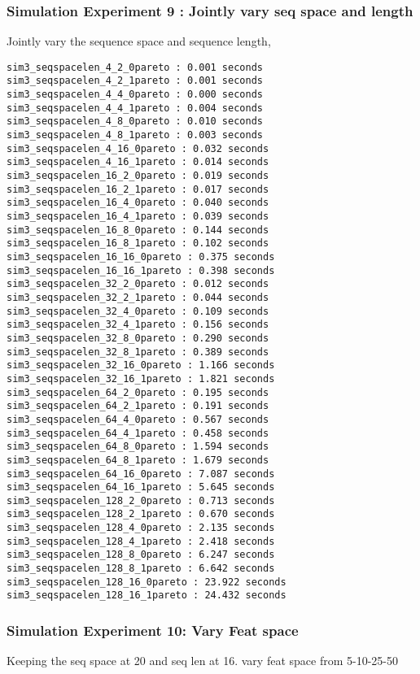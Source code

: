 \documentclass{article}
\begin{document}
\subsubsection{Simulation Experiment 9 : Jointly vary seq space and length}
\label{sim:seqspacelen}
Jointly vary the sequence space and sequence length, 
\begin{verbatim}
sim3_seqspacelen_4_2_0pareto : 0.001 seconds
sim3_seqspacelen_4_2_1pareto : 0.001 seconds
sim3_seqspacelen_4_4_0pareto : 0.000 seconds
sim3_seqspacelen_4_4_1pareto : 0.004 seconds
sim3_seqspacelen_4_8_0pareto : 0.010 seconds
sim3_seqspacelen_4_8_1pareto : 0.003 seconds
sim3_seqspacelen_4_16_0pareto : 0.032 seconds
sim3_seqspacelen_4_16_1pareto : 0.014 seconds
sim3_seqspacelen_16_2_0pareto : 0.019 seconds
sim3_seqspacelen_16_2_1pareto : 0.017 seconds
sim3_seqspacelen_16_4_0pareto : 0.040 seconds
sim3_seqspacelen_16_4_1pareto : 0.039 seconds
sim3_seqspacelen_16_8_0pareto : 0.144 seconds
sim3_seqspacelen_16_8_1pareto : 0.102 seconds
sim3_seqspacelen_16_16_0pareto : 0.375 seconds
sim3_seqspacelen_16_16_1pareto : 0.398 seconds
sim3_seqspacelen_32_2_0pareto : 0.012 seconds
sim3_seqspacelen_32_2_1pareto : 0.044 seconds
sim3_seqspacelen_32_4_0pareto : 0.109 seconds
sim3_seqspacelen_32_4_1pareto : 0.156 seconds
sim3_seqspacelen_32_8_0pareto : 0.290 seconds
sim3_seqspacelen_32_8_1pareto : 0.389 seconds
sim3_seqspacelen_32_16_0pareto : 1.166 seconds
sim3_seqspacelen_32_16_1pareto : 1.821 seconds
sim3_seqspacelen_64_2_0pareto : 0.195 seconds
sim3_seqspacelen_64_2_1pareto : 0.191 seconds
sim3_seqspacelen_64_4_0pareto : 0.567 seconds
sim3_seqspacelen_64_4_1pareto : 0.458 seconds
sim3_seqspacelen_64_8_0pareto : 1.594 seconds
sim3_seqspacelen_64_8_1pareto : 1.679 seconds
sim3_seqspacelen_64_16_0pareto : 7.087 seconds
sim3_seqspacelen_64_16_1pareto : 5.645 seconds
sim3_seqspacelen_128_2_0pareto : 0.713 seconds
sim3_seqspacelen_128_2_1pareto : 0.670 seconds
sim3_seqspacelen_128_4_0pareto : 2.135 seconds
sim3_seqspacelen_128_4_1pareto : 2.418 seconds
sim3_seqspacelen_128_8_0pareto : 6.247 seconds
sim3_seqspacelen_128_8_1pareto : 6.642 seconds
sim3_seqspacelen_128_16_0pareto : 23.922 seconds
sim3_seqspacelen_128_16_1pareto : 24.432 seconds
\end{verbatim}

\subsubsection{Simulation Experiment 10: Vary Feat space }
\label{sim:featspace}
Keeping the seq space at 20 and seq len at 16. vary feat space from 5-10-25-50
\end{document}
